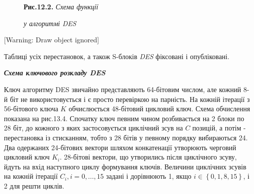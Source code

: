 \documentclass[a4paper]{article}
\newcounter{}
\begin{document}
\begin{figure}
\centering
\begin{minipage}{2.6437in}
{\centering
\textbf{Рис.12.2. }\textit{Схема функції } $ $
\par}

{\centering\itshape
у алгоритмі DES
\par}
\end{minipage}
\end{figure}

\bigskip

[Warning: Draw object ignored]


\bigskip


\bigskip


\bigskip


\bigskip


\bigskip


\bigskip


\bigskip


\bigskip


\bigskip


\bigskip


\bigskip

Таблиці усіх перестановок, а також S-блоків \textit{DES} фіксовані і
опубліковані.


\bigskip

{\centering\bfseries\itshape
Схема ключового розкладу DES
\par}


\bigskip

  Ключ алгоритму DES звичайно представляють 64-бітовим числом, але  кожний 8-й
біт не використовується і є просто перевіркою на парність. На кожній ітерації з
56-бітового ключа  ${K}$\textit{ }обчислюється 48-бітовий цикловий ключ. Схема
обчислення показана на рис.13.4. Спочатку ключ певним чином розбивається на 2
блоки по 28 біт, до кожного з яких застосовується циклічний зсув на  ${C}$
позицій, а потім - перестановка із стисканням, тобто  з 28 бітів у певному
порядку вибираються 24. Два одержаних 24-бітових вектори шляхом конкатенації
утворюють черговий цикловий ключ  ${K_{{i}}}$. 28-бітові вектори, що утворились
після циклічного зсуву, йдуть на вхід наступного циклу формування ключів.
Величини циклічних зсувів на кожній ітерації 
${C_{{i}},i=0,\text{.}\text{.}\text{.},\text{15}}$ задані і дорівнюють 1, якщо 
${i\in \left\{0,1,8,\text{15}\right\}}$, і 2 для решти циклів.
\end{document}
